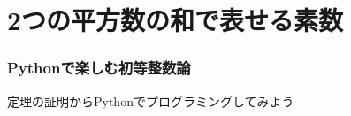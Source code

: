 \documentclass[dvipdfmx,11pt,notheorems]{beamer}
\theoremstyle{definition}
\newtheorem{definition}{定義}
\begin{document}
\section{2つの平方数の和で表せる素数}

\begin{frame}\frametitle{Pythonで楽しむ初等整数論}
\huge{定理の証明からPythonでプログラミングしてみよう}
\end{frame}

%
%
%
%
%
%
%
%
%
%
%
\end{document}
